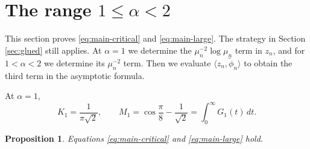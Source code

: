 \documentclass[11pt]{amsart}
\numberwithin{equation}{section}
\newtheorem{proposition}[proposition]{Proposition}
\theoremstyle{remark}
\newcommand{\wt}{\widetilde}
\begin{document}
\section{The range \texorpdfstring{$1\le\alpha<2$}{1 <= alpha < 2}}
\label{sec:large-unified}

This section proves \eqref{eq:main-critical} and \eqref{eq:main-large}. The strategy in Section \ref{sec:glued} still applies.
At $\alpha=1$ we determine the $\mu_n^{-2}\log\mu_n$ term in $z_n$, and
for $1<\alpha<2$ we determine its $\mu_n^{-2}$ term.  Then we evaluate
$\langle z_n,\wt\phi_n\rangle$ to obtain the third term in the asymptotic formula.

At $\alpha=1$,
\[
 K_1=\frac1{\pi\sqrt2},
 \qquad
 M_1=\cos\frac\pi8-\frac1{\sqrt2}
 =\int_0^\infty G_1(t)\,dt.
\]

\begin{proposition}\label{prop:alpha-ge-one}
Equations \eqref{eq:main-critical} and \eqref{eq:main-large} hold.
\end{proposition}
\end{document}

